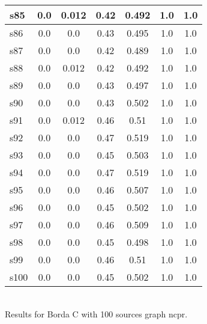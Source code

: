 \documentclass{article}
\begin{document}
\begin{tabular}{|l|c|c|c|c|c|c|}
\hline
s85 &0.0 & 0.012 & 0.42 & 0.492 & 1.0 & 1.0\\
\hline
s86 &0.0 & 0.0 & 0.43 & 0.495 & 1.0 & 1.0\\
\hline
s87 &0.0 & 0.0 & 0.42 & 0.489 & 1.0 & 1.0\\
\hline
s88 &0.0 & 0.012 & 0.42 & 0.492 & 1.0 & 1.0\\
\hline
s89 &0.0 & 0.0 & 0.43 & 0.497 & 1.0 & 1.0\\
\hline
s90 &0.0 & 0.0 & 0.43 & 0.502 & 1.0 & 1.0\\
\hline
s91 &0.0 & 0.012 & 0.46 & 0.51 & 1.0 & 1.0\\
\hline
s92 &0.0 & 0.0 & 0.47 & 0.519 & 1.0 & 1.0\\
\hline
s93 &0.0 & 0.0 & 0.45 & 0.503 & 1.0 & 1.0\\
\hline
s94 &0.0 & 0.0 & 0.47 & 0.519 & 1.0 & 1.0\\
\hline
s95 &0.0 & 0.0 & 0.46 & 0.507 & 1.0 & 1.0\\
\hline
s96 &0.0 & 0.0 & 0.45 & 0.502 & 1.0 & 1.0\\
\hline
s97 &0.0 & 0.0 & 0.46 & 0.509 & 1.0 & 1.0\\
\hline
s98 &0.0 & 0.0 & 0.45 & 0.498 & 1.0 & 1.0\\
\hline
s99 &0.0 & 0.0 & 0.46 & 0.51 & 1.0 & 1.0\\
\hline
s100 &0.0 & 0.0 & 0.45 & 0.502 & 1.0 & 1.0\\
\hline
\end{tabular}\\

\noindent Results for Borda C with 100 sources graph ncpr.
\end{document}
